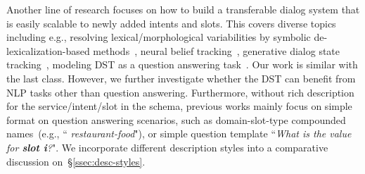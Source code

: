  Another line of
research focuses on how to build a transferable dialog system that is
easily scalable to newly added intents and slots. This covers diverse
topics including e.g., resolving lexical/morphological variabilities
by symbolic de-lexicalization-based methods~\cite{henderson2014word,
  williams2016dialog}, neural belief
tracking~\cite{mrkvsic2017neural}, generative dialog state
tracking~\cite{peng2020soloist, hosseini2020simple}, modeling DST as a
question answering task~\cite{zhang2019find, lee2019sumbt,
  gao2020machine, gao2019dialog}. Our work is similar with the last
class. However, we further investigate whether the DST can benefit
from NLP tasks other than question answering. Furthermore, without
rich description for the service/intent/slot in the schema, previous
works mainly focus on simple format on question answering scenarios,
such as domain-slot-type compounded names~(e.g., ``{\it
  restaurant-food}"), or simple question template ``{\it What is the
  value for {\bf slot i}?}". We incorporate different description
styles into a comparative discussion on~\S\ref{ssec:desc-styles}.

